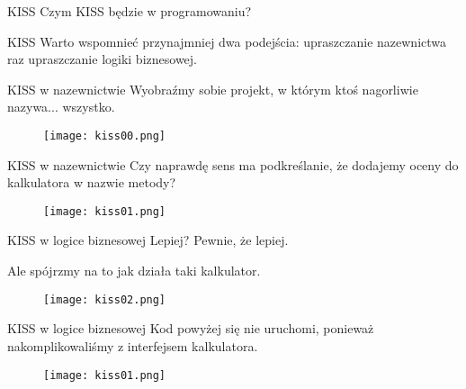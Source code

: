 \begin{frame}{KISS}
	Czym KISS będzie w programowaniu? 
\end{frame}

\begin{frame}{KISS}
	Warto wspomnieć przynajmniej dwa podejścia: upraszczanie nazewnictwa raz upraszczanie logiki biznesowej.
\end{frame}

\begin{frame}{KISS w nazewnictwie}
	Wyobraźmy sobie projekt, w którym ktoś nagorliwie nazywa... wszystko.
\end{frame}

\begin{frame}
	\begin{figure} \centering
		\texttt{[image: kiss00.png]}
	\end{figure}
\end{frame}

\begin{frame}{KISS w nazewnictwie}
	Czy naprawdę sens ma podkreślanie, że dodajemy oceny do kalkulatora w nazwie metody? 
\end{frame}

\begin{frame}
	\begin{figure} \centering
		\texttt{[image: kiss01.png]}
	\end{figure}
\end{frame}

\begin{frame}{KISS w logice biznesowej}
	Lepiej? Pewnie, że lepiej.
	
	Ale spójrzmy na to jak działa taki kalkulator.
\end{frame}

\begin{frame}
	\begin{figure} \centering
		\texttt{[image: kiss02.png]}
	\end{figure}
\end{frame}

\begin{frame}{KISS w logice biznesowej}
	Kod powyżej się nie uruchomi, ponieważ nakomplikowaliśmy z interfejsem kalkulatora.
\end{frame}

\begin{frame}
	\begin{figure} \centering
		\texttt{[image: kiss01.png]}
	\end{figure}
\end{frame}

